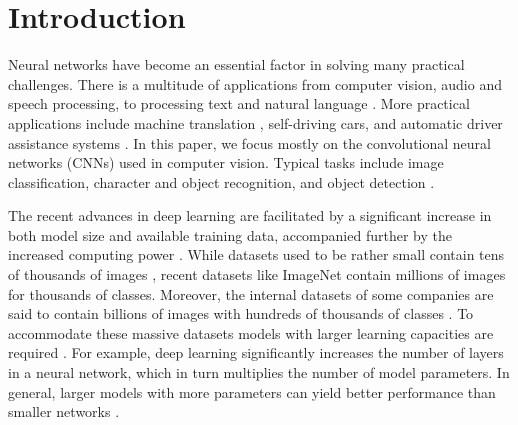 \documentclass[conference,compsoc,a4paper]{IEEEtran}
\begin{document}
\section{Introduction} %
\label{sec:introduction}
%
%

Neural networks have become an essential factor in solving many practical challenges.
There is a multitude of applications from computer vision, audio and speech processing, to processing text and natural language \cite{chen2016-Revisiting-distributed-synchronous-SGD,dean2012-Large-scale-distributed,yadan2013-Multi-GPU-Training}.
More practical applications include machine translation \cite{sutskever2014sequence}, self-driving cars, and automatic driver assistance systems \cite{jin2016-How-to-scale}.
%
In this paper, we focus mostly on the convolutional neural networks (CNNs) used in computer vision.
Typical tasks include image classification, character and object recognition, and object detection \cite{paine2013-GPU-async-SGD}.


The recent advances in deep learning are facilitated by a significant increase in both model size and available training data, accompanied further by the increased computing power \cite{chen2016-Revisiting-distributed-synchronous-SGD,chilimbi2014-Project-Adam}.
%
While datasets used to be rather small contain tens of thousands of images \cite{lecun1998gradient,krizhevsky2009CIFAR10}, recent datasets like ImageNet \cite{imagenet_cvpr09} contain millions of images for thousands of classes.
Moreover, the internal datasets of some companies are said to contain billions of images with hundreds of thousands of classes \cite{iandola2016-Firecaffe}.
%
To accommodate these massive datasets models with larger learning capacities are required \cite{krizhevsky2012-AlexNet}.
For example, deep learning significantly increases the number of layers in a neural network, which in turn multiplies the number of model parameters.
In general, larger models with more parameters can yield better performance than smaller networks \cite{coates2013-DL-COTS-HPC,dean2012-Large-scale-distributed,krizhevsky2012-AlexNet}.
\end{document}
